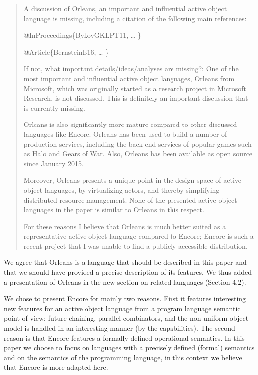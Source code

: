 \documentclass{article}
\begin{document}
\begin{quote}
	 A discussion of Orleans, an important and 
influential active object language is missing, including a citation of the following main 
references:

@InProceedings\{BykovGKLPT11,
\ldots
\}

@Article\{BernsteinB16,
\ldots
\}


If not, what important details/ideas/analyses are missing?: One of the most important and 
influential active object languages, Orleans from Microsoft, which was originally started 
as a research project in Microsoft Research, is not discussed. This is definitely an 
important discussion that is currently missing.

Orleans is also significantly more mature compared to other discussed languages like 
Encore. Orleans has been used to build a number of production services, including the 
back-end services of popular games such as Halo and Gears of War. Also, Orleans has been 
available as open source since January 2015.

Moreover, Orleans presents a unique point in the design space of active object languages, 
by virtualizing actors, and thereby simplifying distributed resource management. None of 
the presented active object languages in the paper is similar to Orleans in this respect.

For these reasons I believe that Orleans is much better suited as a representative active 
object language compared to Encore; Encore is such a recent project that I was unable to 
find a publicly accessible distribution.

\end{quote}
We agree that Orleans is a language that should be described in this paper and that we 
should have provided a precise description of its features.
We thus added a presentation of Orleans in the new section on related languages 
(Section 4.2).

We chose to present Encore for mainly two reasons. First it 
features interesting new features for an active object language from a program language 
semantic point of view: future chaining, parallel combinators, and the 
non-uniform object model is handled in an interesting manner (by the capabilities). The 
second reason is that 
Encore features a formally defined operational semantics. 
In this paper we choose to focus on languages with a precisely defined (formal) semantics 
and on the  semantics of the programming language, in this context we believe 
that Encore is more adapted here. 
\end{document}
